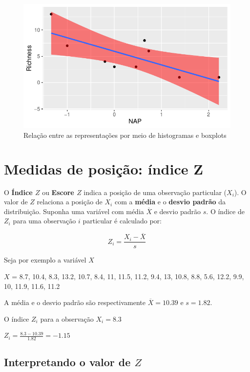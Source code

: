 \documentclass[
]{book}
\begin{document}
\begin{figure}

{\centering \includegraphics{probest-cambientais_files/figure-latex/unnamed-chunk-156-1} 

}

\caption{Relação entre as representações por meio de histogramas e boxplots}\label{fig:unnamed-chunk-156}
\end{figure}

\hypertarget{escorez}{%
\chapter{Medidas de posição: índice Z}\label{escorez}}

O \textbf{Índice \(Z\)} ou \textbf{Escore \(Z\)} indica a posição de uma observação particular (\(X_i\)). O valor de \(Z\) relaciona a posição de \(X_i\) com a \textbf{média} e o \textbf{desvio padrão} da distribuição. Suponha uma variável com média \(\overline{X}\) e desvio padrão \(s\). O índice de \(Z_i\) para uma observação \(i\) particular é calculado por:

\[Z_i = \frac{X_i - \overline{X}}{s}\]

Seja por exemplo a variável \(X\)

\(X\) = 8.7, 10.4, 8.3, 13.2, 10.7, 8.4, 11, 11.5, 11.2, 9.4, 13, 10.8, 8.8, 5.6, 12.2, 9.9, 10, 11.9, 11.6, 11.2

A média e o desvio padrão são respectivamente \(\overline{X} = 10.39\) e \(s = 1.82\).

O índice \(Z_i\) para a observação \(X_i = 8.3\)

\(Z_i = \frac{8.3 - 10.39}{1.82} = -1.15\)

\hypertarget{interpretando-o-valor-de-z}{%
\section{\texorpdfstring{Interpretando o valor de \(Z\)}{Interpretando o valor de Z}}\label{interpretando-o-valor-de-z}}
\end{document}
